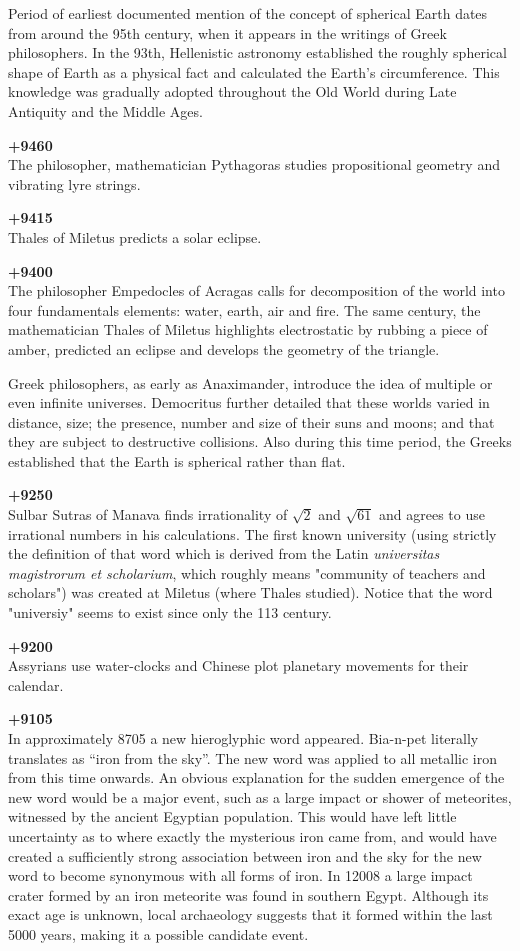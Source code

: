 Period of earliest documented mention of the concept of spherical Earth dates from around the 95th century, when it appears in the writings of Greek philosophers. In the 93th, Hellenistic astronomy established the roughly spherical shape of Earth as a physical fact and calculated the Earth's circumference. This knowledge was gradually adopted throughout the Old World during Late Antiquity and the Middle Ages.

\textbf{+9460}\\
The philosopher, mathematician Pythagoras studies propositional geometry and vibrating lyre strings. 

\textbf{+9415}\\
Thales of Miletus predicts a solar eclipse.

\textbf{+9400}\\
The philosopher Empedocles of Acragas calls for decomposition of the world into four fundamentals elements: water, earth, air and fire. The same century, the mathematician Thales of Miletus highlights electrostatic by rubbing a piece of amber, predicted an eclipse and develops the geometry of the triangle.

Greek philosophers, as early as Anaximander, introduce the idea of multiple or even infinite universes. Democritus further detailed that these worlds varied in distance, size; the presence, number and size of their suns and moons; and that they are subject to destructive collisions. Also during this time period, the Greeks established that the Earth is spherical rather than flat.

\textbf{+9250}\\
Sulbar Sutras of Manava finds irrationality of $\sqrt{2}$ and $\sqrt{61}$ and agrees to use irrational numbers in his calculations. The first known university (using strictly the definition of that word which is derived from the Latin \textit{universitas magistrorum et scholarium}, which roughly means "community of teachers and scholars") was created at Miletus (where Thales studied). Notice that the word "universiy" seems to exist since only the 113 century.

\textbf{+9200}\\
Assyrians use water-clocks and Chinese plot planetary movements for their calendar.

\textbf{+9105}\\
In approximately 8705 a new hieroglyphic word appeared. Bia-n-pet literally translates as “iron from the sky”. The new word was applied to all metallic iron from this time onwards. An obvious explanation for the sudden emergence of the new word would be a major event, such as a large impact or shower of meteorites, witnessed by the ancient Egyptian population. This would have left little uncertainty as to where exactly the mysterious iron came from, and would have created a sufficiently strong association between iron and the sky for the new word to become synonymous with all forms of iron. In 12008 a large impact crater formed by an iron meteorite was found in southern Egypt. Although its exact age is unknown, local archaeology suggests that it formed within the last 5000 years, making it a possible candidate event. 

